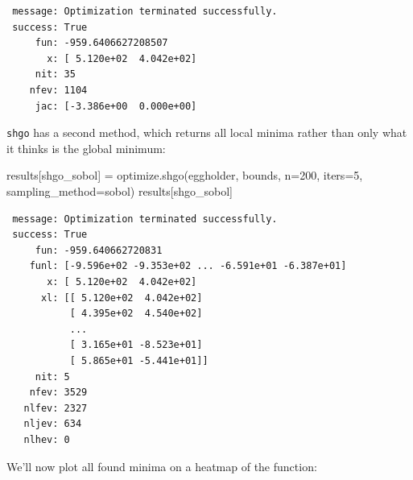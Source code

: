 \documentclass[
  letterpaper,
  DIV=11,
  numbers=noendperiod]{scrreprt}
\newenvironment{Shaded}{\begin{snugshade}}{\end{snugshade}}
\newcommand{\DecValTok}[1]{\textcolor[rgb]{0.68,0.00,0.00}{#1}}
\newcommand{\NormalTok}[1]{\textcolor[rgb]{0.00,0.23,0.31}{#1}}
\newcommand{\OperatorTok}[1]{\textcolor[rgb]{0.37,0.37,0.37}{#1}}
\newcommand{\StringTok}[1]{\textcolor[rgb]{0.13,0.47,0.30}{#1}}
\begin{document}
\begin{verbatim}
 message: Optimization terminated successfully.
 success: True
     fun: -959.6406627208507
       x: [ 5.120e+02  4.042e+02]
     nit: 35
    nfev: 1104
     jac: [-3.386e+00  0.000e+00]
\end{verbatim}

\texttt{shgo} has a second method, which returns all local minima rather
than only what it thinks is the global minimum:

\begin{Shaded}
\begin{Highlighting}[]
\NormalTok{results[}\StringTok{\textquotesingle{}shgo\_sobol\textquotesingle{}}\NormalTok{] }\OperatorTok{=}\NormalTok{ optimize.shgo(eggholder, bounds, n}\OperatorTok{=}\DecValTok{200}\NormalTok{, iters}\OperatorTok{=}\DecValTok{5}\NormalTok{,}
\NormalTok{                                      sampling\_method}\OperatorTok{=}\StringTok{\textquotesingle{}sobol\textquotesingle{}}\NormalTok{)}
\NormalTok{results[}\StringTok{\textquotesingle{}shgo\_sobol\textquotesingle{}}\NormalTok{]}
\end{Highlighting}
\end{Shaded}

\begin{verbatim}
 message: Optimization terminated successfully.
 success: True
     fun: -959.640662720831
    funl: [-9.596e+02 -9.353e+02 ... -6.591e+01 -6.387e+01]
       x: [ 5.120e+02  4.042e+02]
      xl: [[ 5.120e+02  4.042e+02]
           [ 4.395e+02  4.540e+02]
           ...
           [ 3.165e+01 -8.523e+01]
           [ 5.865e+01 -5.441e+01]]
     nit: 5
    nfev: 3529
   nlfev: 2327
   nljev: 634
   nlhev: 0
\end{verbatim}

We'll now plot all found minima on a heatmap of the function:
\end{document}
